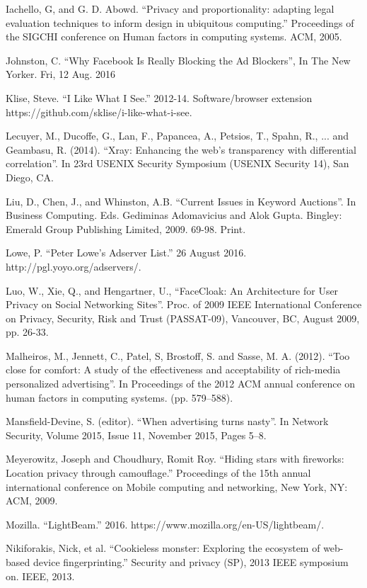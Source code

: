 \documentclass[conference]{IEEEtran}
\begin{document}
\begin{thebibliography}{99}
 Iachello, G, and G. D. Abowd. “Privacy and proportionality: adapting legal evaluation techniques to inform design in ubiquitous computing.” Proceedings of the SIGCHI conference on Human factors in computing systems. ACM, 2005.

 Johnston, C. “Why Facebook Is Really Blocking the Ad Blockers”, In The New Yorker. Fri, 12 Aug. 2016

 Klise, Steve. “I Like What I See.” 2012-14. Software/browser extension https://github.com/sklise/i-like-what-i-see.

 Lecuyer, M., Ducoffe, G., Lan, F., Papancea, A., Petsios, T., Spahn, R., ... and Geambasu, R. (2014). “Xray: Enhancing the web's transparency with differential correlation”. In 23rd USENIX Security Symposium (USENIX Security 14), San Diego, CA.

 Liu, D., Chen, J., and Whinston, A.B. “Current Issues in Keyword Auctions”. In Business Computing. Eds. Gediminas Adomavicius and Alok Gupta. Bingley: Emerald Group Publishing Limited, 2009. 69-98. Print.

 Lowe, P. “Peter Lowe's Adserver List.” 26 August 2016. http://pgl.yoyo.org/adservers/.

 Luo, W., Xie, Q., and Hengartner, U., “FaceCloak: An Architecture for User Privacy on Social Networking Sites”. Proc. of 2009 IEEE International Conference on Privacy, Security, Risk and Trust (PASSAT-09), Vancouver, BC, August 2009, pp. 26-33.

 Malheiros, M., Jennett, C., Patel, S, Brostoff, S. and Sasse, M. A. (2012). “Too close for comfort: A study of the effectiveness and acceptability of rich-media personalized advertising”. In Proceedings of the 2012 ACM annual conference on human factors in computing systems. (pp. 579–588).

 Mansfield-Devine, S. (editor). “When advertising turns nasty”. In Network Security, Volume 2015, Issue 11, November 2015, Pages 5–8.

 Meyerowitz, Joseph and Choudhury, Romit Roy. “Hiding stars with fireworks: Location privacy through camouflage.” Proceedings of the 15th annual international conference on Mobile computing and networking, New York, NY: ACM, 2009.

 Mozilla. “LightBeam.” 2016. https://www.mozilla.org/en-US/lightbeam/.

 Nikiforakis, Nick, et al. “Cookieless monster: Exploring the ecosystem of web-based device fingerprinting.” Security and privacy (SP), 2013 IEEE symposium on. IEEE, 2013.


\end{thebibliography}
\end{document}
